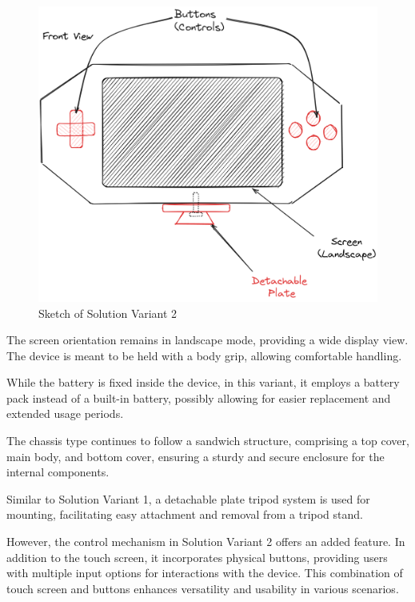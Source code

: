 \begin{figure}[ht!]
    \centering
    \includegraphics[width=\linewidth]{texs/Part1/chapter3/image/v2.png}
    \caption{Sketch of Solution Variant 2}
    \label{fig:sketch-solution-variant-2}
\end{figure}

The screen orientation remains in landscape mode, providing a wide display view. The device is meant to be held with a body grip, allowing comfortable handling.

While the battery is fixed inside the device, in this variant, it employs a battery pack instead of a built-in battery, possibly allowing for easier replacement and extended usage periods.

The chassis type continues to follow a sandwich structure, comprising a top cover, main body, and bottom cover, ensuring a sturdy and secure enclosure for the internal components.

Similar to Solution Variant 1, a detachable plate tripod system is used for mounting, facilitating easy attachment and removal from a tripod stand.

However, the control mechanism in Solution Variant 2 offers an added feature. In addition to the touch screen, it incorporates physical buttons, providing users with multiple input options for interactions with the device. This combination of touch screen and buttons enhances versatility and usability in various scenarios.

